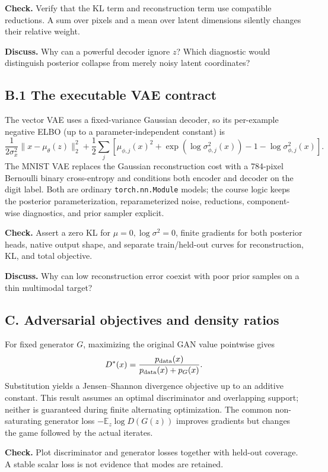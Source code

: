\documentclass[11pt]{article}
\newcommand{\code}[1]{\texttt{#1}}
\newcommand{\E}{\mathbb{E}}
\begin{document}
\textbf{Check.} Verify that the KL term and reconstruction term use compatible
reductions. A sum over pixels and a mean over latent dimensions silently changes
their relative weight.

\textbf{Discuss.} Why can a powerful decoder ignore $z$? Which diagnostic would
distinguish posterior collapse from merely noisy latent coordinates?

\subsection*{B.1 The executable VAE contract}

The vector VAE uses a fixed-variance Gaussian decoder, so its per-example
negative ELBO (up to a parameter-independent constant) is
\[
 \frac{1}{2\sigma_x^2}\lVert x-\mu_\theta(z)\rVert_2^2
 +\frac12\sum_j\left[
 \mu_{\phi,j}(x)^2+\exp(\log\sigma_{\phi,j}^2(x))
 -1-\log\sigma_{\phi,j}^2(x)\right].
\]
The MNIST VAE replaces the Gaussian reconstruction cost with a 784-pixel
Bernoulli binary cross-entropy and conditions both encoder and decoder on the
digit label. Both are ordinary \code{torch.nn.Module} models; the course logic
keeps the posterior parameterization, reparameterized noise, reductions,
component-wise diagnostics, and prior sampler explicit.

\textbf{Check.} Assert a zero KL for $\mu=0,\log\sigma^2=0$, finite gradients for
both posterior heads, native output shape, and separate train/held-out curves for
reconstruction, KL, and total objective.

\textbf{Discuss.} Why can low reconstruction error coexist with poor prior
samples on a thin multimodal target?

\subsection*{C. Adversarial objectives and density ratios}

For fixed generator $G$, maximizing the original GAN value pointwise gives
\[
 D^*(x)=\frac{p_{\rm data}(x)}{p_{\rm data}(x)+p_G(x)}.
\]
Substitution yields a Jensen--Shannon divergence objective up to an additive
constant. This result assumes an optimal discriminator and overlapping support;
neither is guaranteed during finite alternating optimization. The common
non-saturating generator loss $-\E_z\log D(G(z))$ improves gradients but changes
the game followed by the actual iterates.

\textbf{Check.} Plot discriminator and generator losses together with held-out
coverage. A stable scalar loss is not evidence that modes are retained.
\end{document}
